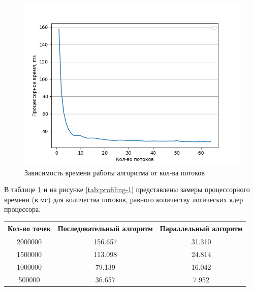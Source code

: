 \begin{figure}[!h]
	\centering
	\includegraphics[scale=0.9]{imgs/measures_1.png}
	\caption{Зависимость времени работы алгоритма от кол-ва потоков}
	\label{img:profiling-1}
\end{figure}
\newpage


В таблице \ref{tab:profiling-2} и на рисунке \ref{tab:profiling-1} представлены замеры процессорного времени (в мс)
для ко­личества потоков, равного количеству логических ядер процессора.
\begin{table}[!ht]
	\begin{center}
		\begin{tabular}{|c|c|c|} 
			\hline
			Кол-во точек & Последовательный алгоритм & Параллельный алгоритм \\  
			\hline
			2000000 & 156.657 & 31.310 \\
			\hline
			1500000 & 113.098 & 24.814 \\
			\hline
			1000000 & 79.139 & 16.042 \\
			\hline
			500000 & 36.657 & 7.952 \\
			\hline
		\end{tabular}
		\label{tab:profiling-2}
	\end{center}
\end{table}

